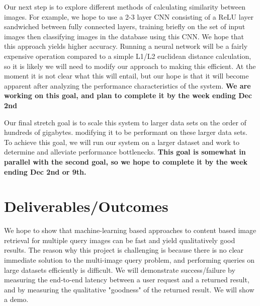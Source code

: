 Our next step is to explore different methods of calculating similarity between images.
For example, we hope to use a 2-3 layer CNN consisting of a ReLU layer sandwiched between fully connected layers,
training briefly on the set of input images then classifying images in the database using this CNN.
We hope that this approach yields higher accuracy.
Running a neural network will be a fairly expensive operation compared to a simple L1/L2 euclidean distance calculation,
so it is likely we will need to modify our approach to making this efficient.
At the moment it is not clear what this will entail, but our hope is that it will become apparent after analyzing
the performance characteristics of the system.
\textbf{We are working on this goal, and plan to complete it by the week ending Dec 2nd}

Our final stretch goal is to scale this system to larger data sets on the order of hundreds of gigabytes.
modifying it to be performant on these larger data sets.
To achieve this goal, we will run our system on a larger dataset and work to determine and alleviate performance bottlenecks.
\textbf{This goal is somewhat in parallel with the second goal, so we hope to complete it by the week ending Dec 2nd or 9th.}

\section{Deliverables/Outcomes}
We hope to show that machine-learning based approaches to content based image retrieval for multiple query images can be fast and yield qualitatively good results.
The reason why this project is challenging is because there is no clear immediate solution to the multi-image query problem, and performing queries on large datasets efficiently
is difficult.
We will demonstrate success/failure by measuring the end-to-end latency between a user request and a returned result, and by measuring the qualitative "goodness" of the returned result.
We will show a demo.
